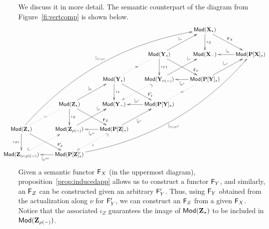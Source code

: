 We discuss it in more detail.
The semantic counterpart of the diagram from Figure~\ref{fi:vertcomp} is
shown below.
\[
\hspace*{-3em}\xymatrix@C=0.8cm@R=1cm{
&&&& \Mod(\thr X_\cons) \ar[dr]^{\fu F_X} \ar[d]^{\iota_X} & \\
&&& \Mod(\thr Y_\cons)  \ar[dr]^>>>{\fu F_Y} \ar[d]^{\iota_{Y1}}
\ar[ur]^{|_{\nu}} \ar@{.}[dl]|{=} 
     & \Mod(\thr X_\weak) & \Mod(\thr{P[X]_\cons}) \ar[l]_{|_{\mu}} \\
&& \Mod(\thr Y_\cons) \ar[dr]^>>>{\fu F'_Y} \ar[d]^{\iota_Y} 
     & \Mod(\thr Y_{\nu(\weak)}) \ar[ur]^>>>>>{|_{\nu}} \ar@{^{(}.>}[dl]
     & \Mod(\thr{P[Y]_\cons}) \ar[l]^{|_{\mu'}} \ar[ur]^{|_{\nu'}}
     \ar@{.}[dl]|{=} \\
& \Mod(\thr Z_\cons) \ar[ur]^{|_\rho} \ar[d]^{\iota_Z} \ar[dr]^>>>{\fu F_Z} & \Mod(\thr Y_\weak) &
       \Mod(\thr{P[Y]_\cons}) \ar[l]_{|_{\mu'}} \\
\Mod(\thr Z_\cons) \ar[d]_{\iota_{Z1}} \ar[dr]^>>>{\fu F'_Z} \ar@{.}[ur]|{=}\ar@/^3pc/[uuuurrrr]^{|_{(\nu;\rho)}}
     & \Mod(\thr Z_{\rho(\weak)}) \ar[ur]^>>>>>{|_{\rho}} &
       \Mod(\thr{P[Z]_\cons}) \ar[l]^{|_{\mu''}} \ar[ur]_{|_{\rho'}}
       \ar@{^{(}.>}[dl]^{\fu i} \\
\Mod(\thr Z_{(\nu;\rho)(\weak)}) \ar@{^{(}.>}[ur]
    & \Mod(\thr{P[Z]'_\cons}) \ar[l]^{|_{\mu'''}}   \ar@/_3pc/[uuuurrrr]_{|_{(\nu;\rho)'}}
}
\]
Given a semantic functor ${\sf {F}}_X$ (in the uppermost diagram),
proposition~\ref{prop:inducedapp} allows us to construct a functor ${\sf {F}}_Y$,
and similarly, an ${\sf {F}}_Z$ can be constructed given an arbitrary ${\sf {F}}'_Y$. Thus, using
${\sf {F}}_Y$ obtained from the actualization along $\nu$ for ${\sf {F}}'_Y$, we can
construct an ${\sf {F}}_Z$ from a given ${\sf {F}}_X$. Notice that the associated
$\iota_Z$ guarantees the image of ${\sf {Mod}}({\bf Z}_\star)$ to be
included in ${\sf {Mod}}({\bf Z}_{\rho(-)})$. 

